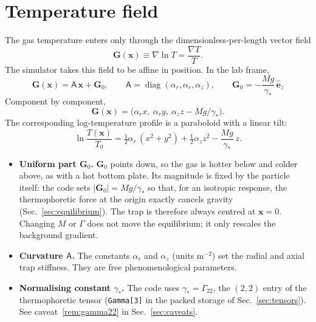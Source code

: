\documentclass[11pt]{article}
\newcommand{\vect}[1]{\bm{#1}}
\newcommand{\tens}[1]{\mathsf{#1}}
\newcommand{\ez}{\hat{\vect{e}}_z}
\newcommand{\Gl}{\vect{G}}
\theoremstyle{remark}
\begin{document}
\section{Temperature field}

The gas temperature enters only through the dimensionless-per-length
vector field
\begin{equation}
  \Gl(\vect{x}) \equiv \nabla\ln T = \frac{\nabla T}{T}.
\end{equation}
The simulator takes this field to be affine in position. In the lab frame,
\begin{equation}
  \boxed{\;
  \Gl(\vect{x}) = \tens{A}\,\vect{x} + \Gl_0, \qquad
  \tens{A} = \operatorname{diag}(\alpha_r,\alpha_r,\alpha_z), \qquad
  \Gl_0 = -\frac{Mg}{\gamma_\ast}\,\ez \;}
  \label{eq:field}
\end{equation}
Component by component,
\begin{equation}
  \Gl(\vect{x}) = \bigl(\alpha_r x,\ \alpha_r y,\ \alpha_z z - Mg/\gamma_\ast\bigr).
\end{equation}
The corresponding log-temperature profile is a paraboloid with a linear
tilt:
\begin{equation}
  \ln\frac{T(\vect{x})}{T_0}
  = \tfrac12\alpha_r\,(x^2+y^2) + \tfrac12\alpha_z z^2 - \frac{Mg}{\gamma_\ast}\,z .
\end{equation}

\begin{itemize}
  \item \textbf{Uniform part $\Gl_0$.} $\Gl_0$ points down, so the gas is
        hotter below and colder above, as with a hot bottom plate. Its
        magnitude is fixed by the particle itself: the code sets
        $|\Gl_0| = Mg/\gamma_\ast$ so that, for an isotropic response, the
        thermophoretic force at the origin exactly cancels gravity
        (Sec.~\ref{sec:equilibrium}). The trap is therefore always
        centred at $\vect{x}=0$. Changing $M$ or $\Gamma$ does not move the
        equilibrium; it only rescales the background gradient.
  \item \textbf{Curvature $\tens{A}$.} The constants $\alpha_r$ and
        $\alpha_z$ (units m$^{-2}$) set the radial and axial trap
        stiffness. They are free phenomenological parameters.
  \item \textbf{Normalising constant $\gamma_\ast$.} The code uses
        $\gamma_\ast = \Gamma_{22}$, the $(2,2)$ entry of the
        thermophoretic tensor (\texttt{Gamma[3]} in the packed
        storage of Sec.~\ref{sec:tensors}). See caveat~\ref{rem:gamma22} in Sec.~\ref{sec:caveats}.
\end{itemize}
\end{document}
